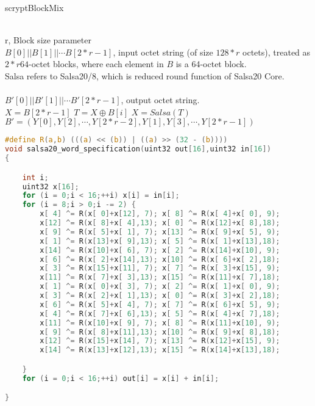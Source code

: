 \begin{algorithm}[tbp]\footnotesize
\caption{scryptBlockMix}
  	\begin{algorithmic}[1]
	    \REQUIRE ~~\\ 
	     r, Block size parameter\\
 		$B[0]||B[1]||\cdots B[2*r-1]$, input octet string (of size $128 * r$ octets), 
 		treated as $2 * r 64$-octet blocks, where each element in $B$ is a 64-octet block.\\
 		Salsa refers to Salsa20/8, which is reduced round function of Salsa20 Core.\\
	    \ENSURE ~~\\
	    $B'[0]||B'[1]||\cdots B'[2*r-1]$, output octet string.\\
	    \STATE $X = B[2*r-1]$
			\STATE $T=X \oplus B[i]$  
			\STATE $X=Salsa(T)$  
		\ENDFOR 
		\RETURN $B'=(Y[0],Y[2],\cdots,Y[2*r-2],Y[1],Y[3],\cdots, Y[2*r-1])$
    \end{algorithmic}
\end{algorithm}

\begin{lstlisting}[language = c, caption = Salsa20/8, label=lst-salsa20core]
#define R(a,b) (((a) << (b)) | ((a) >> (32 - (b)))) 
void salsa20_word_specification(uint32 out[16],uint32 in[16]) 
{

	int i; 
	uint32 x[16]; 
	for (i = 0;i < 16;++i) x[i] = in[i]; 
	for (i = 8;i > 0;i -= 2) { 
		x[ 4] ^= R(x[ 0]+x[12], 7); x[ 8] ^= R(x[ 4]+x[ 0], 9);
		x[12] ^= R(x[ 8]+x[ 4],13); x[ 0] ^= R(x[12]+x[ 8],18); 
		x[ 9] ^= R(x[ 5]+x[ 1], 7); x[13] ^= R(x[ 9]+x[ 5], 9); 
		x[ 1] ^= R(x[13]+x[ 9],13); x[ 5] ^= R(x[ 1]+x[13],18); 
		x[14] ^= R(x[10]+x[ 6], 7); x[ 2] ^= R(x[14]+x[10], 9); 
		x[ 6] ^= R(x[ 2]+x[14],13); x[10] ^= R(x[ 6]+x[ 2],18); 
		x[ 3] ^= R(x[15]+x[11], 7); x[ 7] ^= R(x[ 3]+x[15], 9); 
		x[11] ^= R(x[ 7]+x[ 3],13); x[15] ^= R(x[11]+x[ 7],18); 
		x[ 1] ^= R(x[ 0]+x[ 3], 7); x[ 2] ^= R(x[ 1]+x[ 0], 9); 
		x[ 3] ^= R(x[ 2]+x[ 1],13); x[ 0] ^= R(x[ 3]+x[ 2],18); 
		x[ 6] ^= R(x[ 5]+x[ 4], 7); x[ 7] ^= R(x[ 6]+x[ 5], 9); 
		x[ 4] ^= R(x[ 7]+x[ 6],13); x[ 5] ^= R(x[ 4]+x[ 7],18); 
		x[11] ^= R(x[10]+x[ 9], 7); x[ 8] ^= R(x[11]+x[10], 9); 
		x[ 9] ^= R(x[ 8]+x[11],13); x[10] ^= R(x[ 9]+x[ 8],18); 
		x[12] ^= R(x[15]+x[14], 7); x[13] ^= R(x[12]+x[15], 9); 
		x[14] ^= R(x[13]+x[12],13); x[15] ^= R(x[14]+x[13],18);

	}
 	for (i = 0;i < 16;++i) out[i] = x[i] + in[i];

}
\end{lstlisting}


